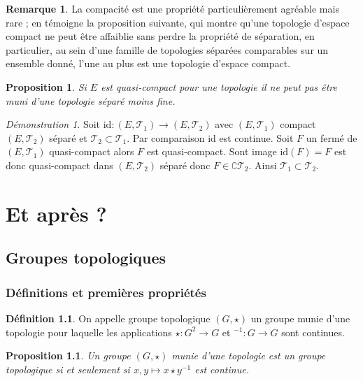 \documentclass[a4paper, 11pt, french]{book}
\theoremstyle{plain} %
\newtheorem{proposition}{Proposition}
\theoremstyle{definition} %
\newtheorem{definition}{Définition}
\newtheorem{remarque}{Remarque}
\theoremstyle{remark} %
\newtheorem*{demonstration}{Démonstration}
\newcommand{\1}{\mathds{1}}
\newcommand{\id}{\mathrm{id}}
\newcommand{\inv}[1]{#1^{-1}}
\begin{document}
\begin{remarque}
	La compacité est une propriété particulièrement agréable mais rare ; en témoigne la proposition suivante, qui montre qu’une topologie d’espace compact ne peut être affaiblie sans perdre la propriété de séparation, en particulier, au sein d’une famille de topologies séparées comparables sur un ensemble donné, l’une au plus est une topologie d’espace compact.
\end{remarque}

\begin{proposition}
	Si $E$ est quasi-compact pour une topologie il ne peut pas être muni d’une topologie séparé moins fine.
\end{proposition}

\begin{demonstration}
	Soit $\id:(E, \mathscr{T}_1)\rightarrow(E, \mathscr{T}_2)$ avec $(E, \mathscr{T}_1)$ compact $(E, \mathscr{T}_2)$ séparé et $\mathscr{T}_2\subset\mathscr{T}_1$.
	Par comparaison $\id$ est continue.
	Soit $F$ un fermé de $(E, \mathscr{T}_1)$ quasi-compact alors $F$ est quasi-compact.
	Sont image $\id(F)=F$ est donc quasi-compact dans $(E, \mathscr{T}_2)$ séparé donc $F\in\complement\mathscr{T}_2$.
	Ainsi $\mathscr{T}_1\subset\mathscr{T}_2$.
\end{demonstration}

\part{Et après ?}

\chapter{Groupes topologiques}

\section{Définitions et premières propriétés}

\begin{definition}
	On appelle groupe topologique $(G, \star)$ un groupe munie d'une topologie pour laquelle les applications $\star:G^2\rightarrow G$ et $\inv{}:G\rightarrow G$ sont continues.
\end{definition}

\begin{proposition}
	Un groupe $(G, \star)$ munie d'une topologie est un groupe topologique si et seulement si $x, y\longmapsto x\star\inv{y}$ est continue.
\end{proposition}
\end{document}
